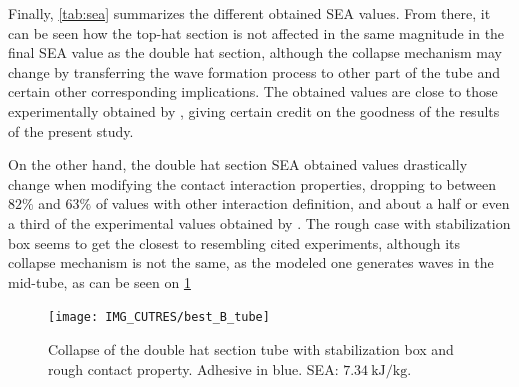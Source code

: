 \documentclass[cmfonts]{witpress}
\begin{document}
Finally, \cref{tab:sea} summarizes the different obtained SEA values. From there, it can be seen how the top-hat section is not affected in the same magnitude in the final SEA value as the double hat section, although the collapse mechanism may change by transferring the wave formation process to other part of the tube and certain other corresponding implications. The obtained values are close to those experimentally obtained by \cite{Peroni2009}, giving certain credit on the goodness of the results of the present study.

On the other hand, the double hat section SEA obtained values drastically change when modifying the contact interaction properties, dropping to between $82\%$ and $63\%$ of values with other interaction definition, and about a half or even a third of the experimental values obtained by \cite{Peroni2009}. The rough case with stabilization box seems to get the closest to resembling cited experiments, although its collapse mechanism is not the same, as the modeled one generates waves in the mid-tube, as can be seen on \cref{fig:best_B_tube}

\begin{figure}
	\centering
	\texttt{[image: IMG\_CUTRES/best\_B\_tube]}
	\caption[Collapse of the double hat section tube with stabilization box and rough contact property.]{Collapse of the double hat section tube with stabilization box and rough contact property. Adhesive in blue. SEA: $\SI{7.34}{\kJ/\kg}$.}
	\label{fig:best_B_tube}
\end{figure}


\end{document}
